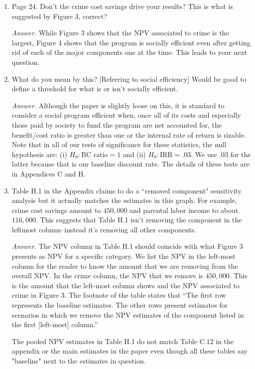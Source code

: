 \begin{enumerate}
\item Page 24. Don't the crime cost savings drive your results? This is what is suggested by Figure 3, correct?

\noindent \textit{Answer.} While Figure 3 shows that the NPV associated to crime is the largest, Figure 4 shows that the program is socially efficient even after getting rid of each of the major components one at the time. This leads to your next question. 

\item What do you mean by this? [Referring to social efficiency] Would be good to define a threshold for what is or isn't socially efficient.

\noindent \textit{Answer.} Although the paper is slightly loose on this, it is standard to consider a social program efficient when, once all of its costs and especially those paid by society to fund the program are net accounted for, the benefit/cost ratio is greater than one or the internal rate of return is sizable. Note that in all of our tests of significance for these statistics, the null hypothesis are: (i) $H_0: \text{BC ratio} = 1$  and (ii) $H_0: \text{IRR} = .03$. We use $.03$ for the latter because that is our baseline discount rate. The details of these tests are in Appendices C and H.

\item Table H.1 in the Appendix claims to do a ``removed component" sensitivity analysis but it actually matches the estimates in this graph. For example, crime cost savings amount to $450,000$ and parental labor income to about $116,000$. This suggests that Table H.1 isn't removing the component in the leftmost column--instead it's removing all other components. 

\noindent \textit{Answer.} The NPV column in Table H.1 should coincide with what Figure 3 presents as NPV for a specific category. We list the NPV in the left-most column for the reader to know the amount that we are removing from the overall NPV. In the crime column, the NPV that we remove is $450,000$. This is the amount that the left-most column shows and the NPV associated to crime in Figure 3. The footnote of the table states that ``The first row represents the baseline estimates. The other rows present estimates for scenarios in which we remove the NPV estimates of the component listed in the first [left-most] column.''

\noindent The pooled NPV estimates in Table H.1 do not match Table C.12 in the appendix or the main estimates in the paper even though all these tables say "baseline" next to the estimates in question.


\end{enumerate}
